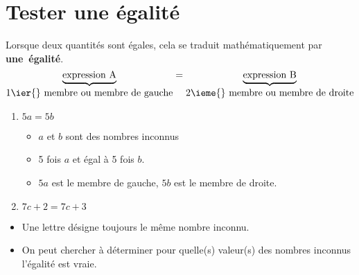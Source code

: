 \section{Tester une égalité}
\begin{definition}
    Lorsque deux quantités sont égales, cela se traduit mathématiquement par \mbox{\textbf{une égalité}}.
    $$\underbrace{\mbox{expression A}}_{\mbox{1\ier{} membre ou membre de gauche}}=\underbrace{\mbox{expression B}}_{\mbox{2\ieme{} membre ou membre de droite}}$$
\end{definition}

\begin{exemple*1}
    \begin{enumerate}
        \item $5a=5b$ 
        \begin{itemize}
            \item $a$ et $b$ sont des nombres inconnus
            \item 5 fois $a$ et égal à 5 fois $b$.
            \item $5a$ est le membre de gauche, $5b$ est le membre de droite.
        \end{itemize}
        \item $7c+2=7c+3$
    \end{enumerate}
\end{exemple*1}

\begin{remarque}
    \begin{itemize}
        \item Une lettre désigne toujours le même nombre inconnu.
        \item On peut chercher à déterminer pour quelle(s) valeur(s) des nombres inconnus l'égalité est vraie.
    \end{itemize}
\end{remarque}

